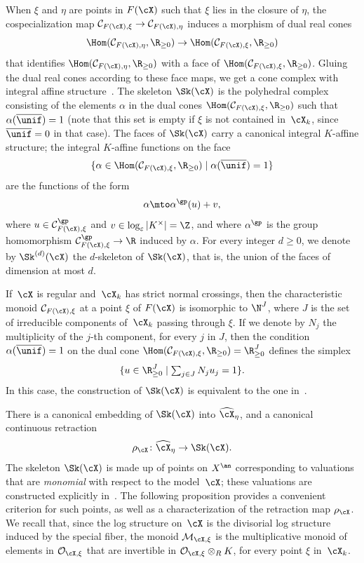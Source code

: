 When $\xi$ and $\eta$ are points in $F(\cX)$ such that $\xi$ lies in the closure of $\eta$, the cospecialization map $\mathcal{C}_{F(\cX),\xi}\to \mathcal{C}_{F(\cX),\eta}$
induces a morphism of dual real cones
\[
\Hom(\mathcal{C}_{F(\cX),\eta},\R_{\geq 0})\to \Hom(\mathcal{C}_{F(\cX),\xi},\R_{\geq 0})
\]
that identifies $\Hom(\mathcal{C}_{F(\cX),\eta},\R_{\geq 0})$ with a face of $\Hom(\mathcal{C}_{F(\cX),\xi},\R_{\geq 0})$. Gluing the dual real cones according to these face maps, we
get a cone complex with integral affine structure~\cite{KKMS}.
The skeleton $\Sk(\cX)$ is the polyhedral complex
consisting of the elements $\alpha$ in the dual cones $\Hom(\mathcal{C}_{F(\cX),\xi},\R_{\geq 0})$ such that
$\alpha(\overline{\unif})=1$ (note that this set is empty if $\xi$ is not contained in~$\cX_k$, since $\overline{\unif}=0$ in that case). The faces of $\Sk(\cX)$ carry a canonical integral $K$\nobreakdash-affine structure; the integral $K$\nobreakdash-affine functions on the face
\[
\{\alpha\in \Hom(\mathcal{C}_{F(\cX),\xi},\R_{\geq 0})\mid \alpha(\overline{\unif})=1\}
\]
are the functions of the form
\[
\alpha\mto \alpha^{\gp}(u)+ v,
\]
where $u\in \mathcal{C}^{\gp}_{F(\cX),\xi}$ and $v\in \log_{\varepsilon}|K^{\times}|=\Z$, and where $\alpha^{\gp}$ is the group homomorphism $\mathcal{C}^{\gp}_{F(\cX),\xi}\to \R$ induced by $\alpha$.
For every integer $d\geq 0$, we denote by $\Sk^{(d)}(\cX)$ the $d$\nobreakdash-ske\-leton of $\Sk(\cX)$, that is, the union of the faces of dimension at most $d$.

\begin{example}\label{exam:snc}
If~$\cX$ is regular and~$\cX_k$ has strict normal crossings, then the characteristic monoid $\mathcal{C}_{F(\cX),\xi}$ at a point $\xi$ of $F(\cX)$ is isomorphic to $\N^J$, where $J$ is the set of irreducible components of~$\cX_k$ passing through $\xi$. If we denote by $N_j$ the multiplicity of the $j$-th component, for every $j$ in $J$, then the condition
$\alpha(\overline{\unif})=1$ on the dual cone $\Hom(\mathcal{C}_{F(\cX),\xi},\R_{\geq 0})=\R^J_{\geq 0}$ defines the simplex
\[
\{u\in \R^J_{\geq 0}\mid \textstyle\sum_{j\in J}N_ju_j=1\}.
\]
In this case, the construction of $\Sk(\cX)$ is equivalent to the one in~\cite[\S3]{MuNi}.
\end{example}

There is a canonical embedding of $\Sk(\cX)$ into $\widehat{\cX}_{\eta}$, and a canonical continuous retraction
\[
\rho_{\cX}\colon \widehat{\cX}_{\eta}\to \Sk(\cX).
\]
The skeleton $\Sk(\cX)$ is made up of points on $X^{\an}$ corresponding to valuations that are {\em monomial} with respect to the model~$\cX$; these valuations are constructed explicitly in~\cite[3.2.10]{BrMa}.
The following proposition provides a convenient criterion for such points, as well as a characterization of the retraction map $\rho_{\cX}$. We recall that, since the log structure on~$\cX$ is the divisorial log structure induced by the special fiber, the monoid $\mathcal{M}_{\cX,\xi}$ is the multiplicative monoid of elements in $\mathcal{O}_{\cX,\xi}$ that are invertible in $\mathcal{O}_{\cX,\xi}\otimes_R K$, for every point $\xi$ in~$\cX_k$.

